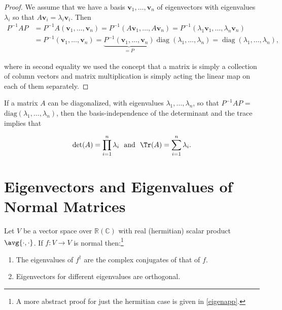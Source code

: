 \documentclass[a4paper,12pt]{report}
\begin{document}
\begin{proof}
We assume that we have a basis \( \mathbf{v}_1, \dots, \mathbf{v}_n \) of eigenvectors with eigenvalues \( \lambda_i \) so that \(A \mathbf{v}_i = \lambda_i \mathbf{v}_i\). Then
\begin{equation}
\begin{aligned}
P^{-1} A P &= P^{-1} A (\mathbf{v}_1, \dots, \mathbf{v}_n) 
           = P^{-1} (A \mathbf{v}_1, \dots, A \mathbf{v}_n) 
           = P^{-1} (\lambda_1 \mathbf{v}_1, \dots, \lambda_n \mathbf{v}_n) \\
           &= P^{-1} (\mathbf{v}_1, \dots, \mathbf{v}_n) 
           = \underbrace{P^{-1} (\mathbf{v}_1, \dots, \mathbf{v}_n)}_{=P} 
           \operatorname{diag}(\lambda_1, \dots, \lambda_n) 
           = \operatorname{diag}(\lambda_1, \dots, \lambda_n),
\end{aligned}
\end{equation}

where in second equality we used the concept that a matrix is simply a collection of column vectors and matrix multiplication is simply acting the linear map on each of them separately.
\end{proof}



If a matrix \(A\) can be diagonalized, with eigenvalues \(\lambda _{1}, \ldots , \lambda _{n}   \), so that \(P^{-1} AP\) = \(\text{diag}(\lambda _{1}, \ldots , \lambda _{n}  ) \), then the basis-independence of the determinant and the trace implies that

\begin{equation}
    \det (A) = \prod_{i=1}^{n} \lambda _{i} ~\text { and }~  \Tr (A) = \sum_{i=1}^{n} \lambda _{i}.  
\end{equation}

\section{Eigenvectors and Eigenvalues of Normal Matrices}

\begin{theorem} \label{eigen} 
Let \(V\) be a vector space over \(\mathbb{R} (\mathbb{C})\) with real (hermitian) scalar product \(\avg{\cdot ,\cdot } \). If \(f: V \rightarrow V\) is normal then:\footnote{A more abstract proof for just the hermitian case is given in \cref{eigenapp}.} 

\begin{enumerate}[label=(\(P\)\arabic*)]
    \item The eigenvalues of \(f^{\dagger} \) are the complex conjugates of that of \(f\).
    \item Eigenvectors for different eigenvalues are orthogonal.
\end{enumerate}
   
\end{theorem}
\end{document}

